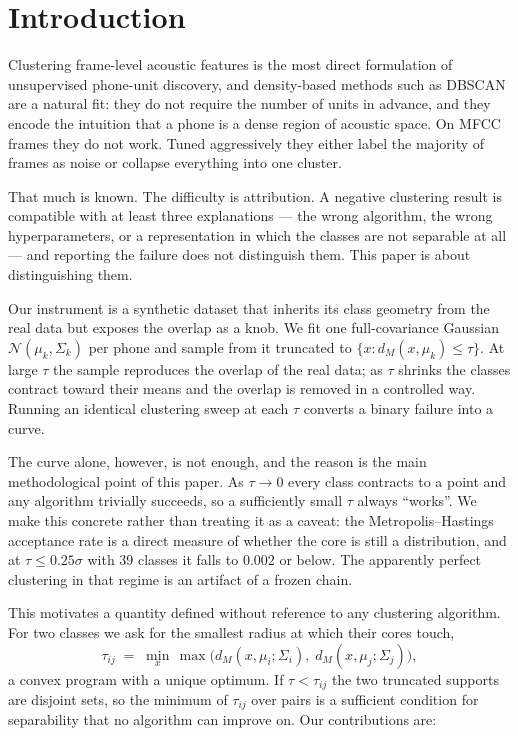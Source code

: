 \documentclass[11pt]{article}
\begin{document}
\section{Introduction}

Clustering frame-level acoustic features is the most direct formulation of
unsupervised phone-unit discovery, and density-based methods such as DBSCAN are
a natural fit: they do not require the number of units in advance, and they
encode the intuition that a phone is a dense region of acoustic space. On MFCC
frames they do not work. Tuned aggressively they either label the majority of
frames as noise or collapse everything into one cluster.

That much is known. The difficulty is attribution. A negative clustering result
is compatible with at least three explanations --- the wrong algorithm, the
wrong hyperparameters, or a representation in which the classes are not
separable at all --- and reporting the failure does not distinguish them. This
paper is about distinguishing them.

Our instrument is a synthetic dataset that inherits its class geometry from the
real data but exposes the overlap as a knob. We fit one full-covariance Gaussian
$\mathcal{N}(\mu_k, \Sigma_k)$ per phone and sample from it truncated to
$\{x : d_M(x,\mu_k) \le \tau\}$. At large $\tau$ the sample reproduces the
overlap of the real data; as $\tau$ shrinks the classes contract toward their
means and the overlap is removed in a controlled way. Running an identical
clustering sweep at each $\tau$ converts a binary failure into a curve.

The curve alone, however, is not enough, and the reason is the main
methodological point of this paper. As $\tau \to 0$ every class contracts to a
point and any algorithm trivially succeeds, so a sufficiently small $\tau$
always ``works''. We make this concrete rather than treating it as a caveat:
the Metropolis--Hastings acceptance rate is a direct measure of whether the core
is still a distribution, and at $\tau \le 0.25\sigma$ with 39 classes it falls
to $0.002$ or below. The apparently perfect clustering in that regime is an
artifact of a frozen chain.

This motivates a quantity defined without reference to any clustering algorithm.
For two classes we ask for the smallest radius at which their cores touch,
\[
\tau_{ij} \;=\; \min_x\, \max\big( d_M(x,\mu_i;\Sigma_i),\;
d_M(x,\mu_j;\Sigma_j) \big),
\]
a convex program with a unique optimum. If $\tau < \tau_{ij}$ the two truncated
supports are disjoint sets, so the minimum of $\tau_{ij}$ over pairs is a
sufficient condition for separability that no algorithm can improve on. Our
contributions are:
\end{document}
